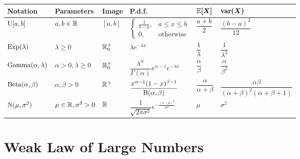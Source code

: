 \documentclass{styles/note}
\begin{document}
  \begin{center}
  \begin{table}[H]
  \begin{tabular}{llllll}
    \textbf{Notation} & \textbf{Parameters} & \textbf{Image} & \textbf{P.d.f.} & $\boldsymbol{\operatorname{\mathbb{E}}[X]}$ & $\boldsymbol{\operatorname{var}(X)}$ \\\hline
    $\operatorname{\mathrm{U}}[a, b]$ & $a, b \in \mathbb{R}$ & $[a, b]$ & $\begin{cases} \frac{1}{b-a}, & a \leqslant x \leqslant b \\ 0, & \textrm{otherwise} \end{cases}$ & $\dfrac{a + b}{2}$ & $\dfrac{(b - a)^2}{12}$ \\
    $\operatorname{\mathrm{Exp}}(\lambda)$ & $\lambda \geqslant 0$ & $\mathbb{R}^+_0$ & $\lambda e^{-\lambda x}$ & $\dfrac{1}{\lambda}$ & $\dfrac{1}{\lambda^2}$ \\
    $\operatorname{\mathrm{Gamma}}(\alpha, \lambda)$ & $\alpha > 0, \lambda \geqslant 0$ & $\mathbb{R}^+_0$ & $\dfrac{\lambda^\alpha}{\Gamma(\alpha)} x^{\alpha-1} e^{-\lambda x}$ & $\dfrac{\alpha}{\beta}$ & $\dfrac{\alpha}{\beta^2}$ \\
    $\operatorname{\mathrm{Beta}}(\alpha, \beta)$ & $\alpha, \beta > 0$ & $\mathbb{R}^+$ & $\dfrac{x^{\alpha-1} (1-x)^{\beta - 1}}{\operatorname{\mathrm{B}}(\alpha, \beta)}$ & $\dfrac{\alpha}{\alpha + \beta}$ & $\dfrac{\alpha\beta}{(\alpha + \beta)^2 (\alpha + \beta + 1)}$ \\
    $\operatorname{\mathrm{N}}(\mu, \sigma^2)$ & $\mu \in \mathbb{R}, \sigma^2 > 0$ & $\mathbb{R}$ & $\dfrac{1}{\sqrt{2\pi\sigma^2}} e^{-\frac{(x - \mu)^2}{2\sigma^2}}$ & $\mu$ & $\sigma^2$
  \end{tabular}
  \end{table}
  \end{center}


\newpage
\section{Weak Law of Large Numbers}
  
\end{document}
